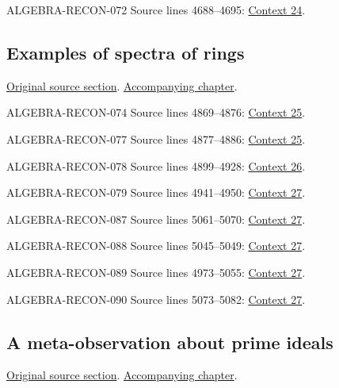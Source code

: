 \begin{AlgebraSourceRoutes}
\item[ALGEBRA-RECON-072] Source lines 4688--4695: \hyperlink{algebra-context-024}{Context 24}.
\end{AlgebraSourceRoutes}

\subsection{Examples of spectra of rings}
\hypertarget{algebra-source-section-examples-spectra}{}
\noindent\href{https://github.com/stacks/stacks-project/blob/a04446e57ec1fbc252a871afcec7752fb2807b14/algebra.tex\#L4816}{Original source section}. \href{algebra.pdf\#nameddest=section-examples-spectra}{Accompanying chapter}.

\begin{AlgebraSourceRoutes}
\item[ALGEBRA-RECON-074] Source lines 4869--4876: \hyperlink{algebra-context-025}{Context 25}.
\item[ALGEBRA-RECON-077] Source lines 4877--4886: \hyperlink{algebra-context-025}{Context 25}.
\item[ALGEBRA-RECON-078] Source lines 4899--4928: \hyperlink{algebra-context-026}{Context 26}.
\item[ALGEBRA-RECON-079] Source lines 4941--4950: \hyperlink{algebra-context-027}{Context 27}.
\item[ALGEBRA-RECON-087] Source lines 5061--5070: \hyperlink{algebra-context-027}{Context 27}.
\item[ALGEBRA-RECON-088] Source lines 5045--5049: \hyperlink{algebra-context-027}{Context 27}.
\item[ALGEBRA-RECON-089] Source lines 4973--5055: \hyperlink{algebra-context-027}{Context 27}.
\item[ALGEBRA-RECON-090] Source lines 5073--5082: \hyperlink{algebra-context-027}{Context 27}.
\end{AlgebraSourceRoutes}

\subsection{A meta-observation about prime ideals}
\hypertarget{algebra-source-section-oka-families}{}
\noindent\href{https://github.com/stacks/stacks-project/blob/a04446e57ec1fbc252a871afcec7752fb2807b14/algebra.tex\#L5089}{Original source section}. \href{algebra.pdf\#nameddest=section-oka-families}{Accompanying chapter}.

